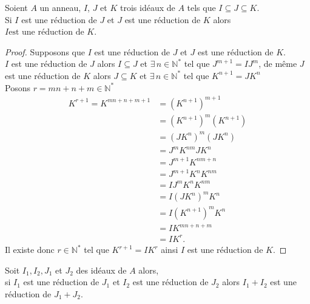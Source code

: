 \begin{maproposition}
	Soient $A$ un anneau, $I$, $J$ et $K$ trois id\'eaux de $A$ tels que 
	$I \subseteq J \subseteq K $.\\ Si $I$ est une réduction de $J$ et $J$ est une réduction de $K$ alors $ I \text{est une réduction de }  K $.
\end{maproposition}
\begin{proof}
	Supposons que $I$ est une réduction de $J$ et $J$ est une réduction de $K$.\\
	$I$ est une réduction de $J$ alors $I \subseteq J$ et $\exists \, n\in \mathbb{N}^{*}$ tel que $J^{m+1} = IJ^{m}$, de même $J$ est une réduction de $K$ alors $J \subseteq K$ et $\exists \, n\in \mathbb{N}^{*}$ tel que $K^{n+1} = JK^{n}$\\
	Posons $r = mn+n+m \in \mathbb{N}^{*}$
	\begin{align*}
		K^{r+1} = K^{mn+n+m+1}& = (K^{n+1})^{m+1}\\
		& = (K^{n+1})^{m}(K^{n+1})\\
		& = (JK^{n})^{m}(JK^{n})\\
		& = J^{m}K^{nm}JK^{n}\\
		& = J^{m+1}K^{nm+n}\\
		& = J^{m+1}K^{n}K^{nm}\\
		& = IJ^{m}K^{n}K^{nm}\\
		& = I(JK^{n})^{m}K^{n}\\
		& = I(K^{n+1})^{m}K^{n}\\
		& = IK^{mn+n+m}  \\
		& = IK^r.          
	\end{align*}
	Il existe donc $r\in \mathbb{N}^{*}$ tel que $K^{r+1} = IK^{r}$ ainsi $I$ est une réduction de $K$.
\end{proof}
\begin{monlemme}
	Soit $I_1, I_2, J_1$ et $J_2$ des idéaux de $A$ alors,\\ si $I_1$ est  une réduction de $J_1$ et $I_2$ est une réduction de $J_2$ alors $I_1+I_2$ est une réduction de $J_1+J_2$.
\end{monlemme}
